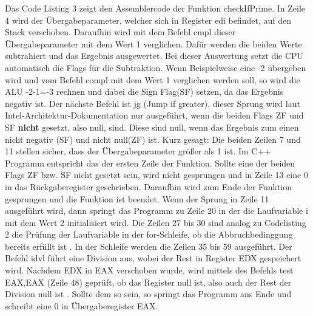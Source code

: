 \documentclass[12pt]{article}
\begin{document}
Das Code Listing 3 zeigt den Assemblercode der Funktion checkIfPrime. In Zeile 4 wird der Übergabeparameter, welcher sich in Register edi befindet, auf den Stack verschoben. Daraufhin wird mit dem Befehl cmpl dieser Übergabeparameter mit dem Wert 1 verglichen. Dafür werden die beiden Werte subtrahiert und das Ergebnis ausgewertet. Bei dieser Auswertung setzt die CPU automatisch die Flags für die Subtraktion. Wenn Beispielweise eine -2 übergeben wird und vom Befehl compl mit dem Wert 1 verglichen werden soll, so wird die ALU -2-1=-3 rechnen und dabei die Sign Flag(SF) setzen, da das Ergebnis negativ ist. Der nächste Befehl ist jg (Jump if greater), dieser Sprung wird laut Intel-Architektur-Dokumentation nur ausgeführt, wenn die beiden Flags ZF und SF \textbf{nicht} gesetzt, also null, sind. Diese sind null, wenn das Ergebnis zum einen nicht negativ (SF) und nicht null(ZF) ist. \newline Kurz gesagt: Die beiden Zeilen 7 und 11 stellen sicher, dass der Übergabeparameter größer als 1 ist. Im C++ Programm entspricht das der ersten Zeile der Funktion. Sollte eine der beiden Flags ZF bzw. SF nicht gesetzt sein, wird nicht gesprungen und in Zeile 13 eine 0 in das Rückgaberegister geschrieben. Daraufhin wird zum Ende der Funktion gesprungen und die Funktion ist beendet. Wenn der Sprung in Zeile 11 ausgeführt wird, dann springt das Programm zu Zeile 20 in der die Laufvariable i  mit dem Wert 2 initialisiert wird. Die Zeilen 27 bis 30 sind analog zu Codelisting 2 die Prüfung der Laufvariable in der for-Schleife, ob die Abbruchbedinggung bereits erfüllt ist \cite{c}. In der Schleife werden die Zeilen 35 bis 59 ausgeführt. Der Befehl idvl führt eine Division aus, wobei der Rest in Register EDX gespeichert wird. Nachdem EDX in EAX verschoben wurde, wird mittels des Befehls test EAX,EAX (Zeile 48) geprüft, ob das Register null ist, also auch der Rest der Division null ist \cite{elements2005}. Sollte dem so sein, so springt das Programm ans Ende und schreibt eine 0 in Übergaberegister EAX\cite[S.202]{technischeInformatik2}.
\newpage

\listoffigures
\newpage
{}
\listoftables
\newpage
{}
\listofcodes
\newpage
{}

\end{document}
